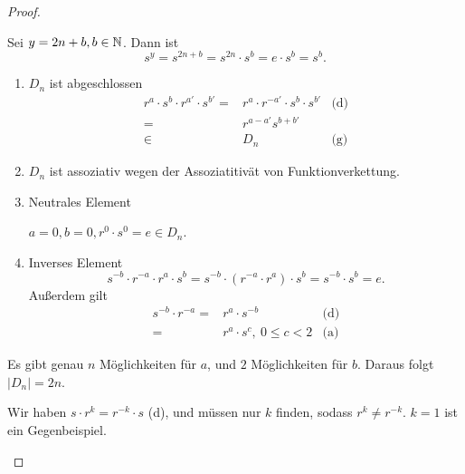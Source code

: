 \begin{proof}
\begin{parts}
\begin{center}
	\end{center}
\item Sei $y=2n+b, b\in \mathbb{N}$. Dann ist 
	\[
		s^y=s^{2n+b}=s^{2n}\cdot s^b=e\cdot s^b=s^b
	.\] 
\item 
	\begin{enumerate}[label=(\roman*)]
		\item $D_n$ ist abgeschlossen
			\begin{align*}
				r^a\cdot s^b\cdot r^{a'}\cdot s^{b'}=&r^a\cdot r^{-a'}\cdot s^b\cdot s^{b'} & \text{(d)}\\
				=&r^{a-a'}s^{b+b'}\\
				\in& D_n & \text{(g)}
			\end{align*}
		\item $D_n$ ist assoziativ wegen der Assoziatitivät von Funktionverkettung.
		\item Neutrales Element

			$a=0,b=0,r^0\cdot s^0=e\in D_n$.
		\item Inverses Element
		 \[
			 s^{-b}\cdot r^{-a}\cdot r^a\cdot s^b=s^{-b}\cdot(r^{-a}\cdot r^a)\cdot s^b=s^{-b}\cdot s^b=e
		.\] 
		Außerdem gilt
		\begin{align*}
			s^{-b}\cdot r^{-a}=&r^a\cdot s^{-b} &\text{(d)}\\
			=&r^a\cdot s^c,~0\le c < 2 & \text{(a)}
		\end{align*}
	\end{enumerate}
\item Es gibt genau $n$ Möglichkeiten für $a$, und $2$ Möglichkeiten f\"{u}r $b$. Daraus folgt $|D_n|=2n$.
\item Wir haben $s\cdot r^k=r^{-k}\cdot s$ (d), und müssen nur $k$ finden, sodass $r^k\neq r^{-k}$. $k=1$ ist ein Gegenbeispiel.\qedhere
\end{parts}
\end{proof}
